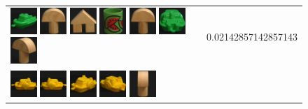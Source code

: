 \begin{figure}[tbp]
\begin{center}
\begin{tabular}{m{11cm} | m{3cm} |}
\includegraphics[width=1cm]{coil/beeld-57.eps} 
\includegraphics[width=1cm]{coil/beeld-0.eps} 
\includegraphics[width=1cm]{coil/beeld-42.eps} 
\includegraphics[width=1cm]{coil/beeld-32.eps} 
\includegraphics[width=1cm]{coil/beeld-1.eps} 
\includegraphics[width=1cm]{coil/beeld-59.eps} 
\includegraphics[width=1cm]{coil/beeld-4.eps} & {\scriptsize 
0.02142857142857143} \\ \includegraphics[width=1cm]{coil/beeld-12.eps} 
\includegraphics[width=1cm]{coil/beeld-13.eps} 
\includegraphics[width=1cm]{coil/beeld-15.eps} 
\includegraphics[width=1cm]{coil/beeld-16.eps} 
\includegraphics[width=1cm]{coil/beeld-5.eps} 

\end{tabular}
\end{center}
\end{figure}
